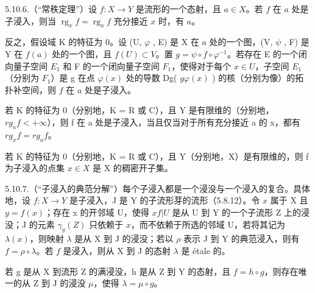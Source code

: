 5.10.6.（“常秩定理”）设 \(f: X \to Y\) 是流形的一个态射，且 \(a \in X\)。若 \(f\) 在 \(a\) 处是子浸入，则当 \(\operatorname{rg}_{x} f = \operatorname{rg}_{a} f\) 充分接近 \(x\) 时，有 \(a\)。

反之，假设域 K 的特征为 0。设 (U, \(\varphi\) , E) 是 X 在 \(a\) 处的一个图，(V, \(\psi\) , F) 是 Y 在 \(f(a)\) 处的一个图，且 \(f(U) \subset V\)。置 \(g = \psi \circ f \circ \varphi^{-1}\)。若存在 E 的一个闭向量子空间 \(E_{1}\) 和 F 的一个闭向量子空间 \(F_{1}\)，使得对于每个 \(x \in U\)，子空间 \(E_{1}\)（分别为 \(F_{1}\)）是 g 在点 \(\varphi(x)\) 处的导数 Dg( \(g\)\(\varphi(x)\) ) 的核（分别为像）的拓扑补空间，则 \(f\) 在 \(a\) 处是子浸入。

若 K 的特征为 0（分别地，K = R 或 C），且 Y 是有限维的（分别地，\(rg_{a}f < +\infty\)），则 f 在 a 处是子浸入，当且仅当对于所有充分接近 a 的 x，都有 \(rg_{x}f = rg_{a}f\)。

若 K 的特征为 0（分别地，K = R 或 C），且 Y（分别地，X）是有限维的，则 f 为子浸入的点集 \(x \in X\) 是 X 的稠密开子集。

5.10.7.（“子浸入的典范分解”）每个子浸入都是一个浸没与一个浸入的复合。具体地，设 \(f: X \to Y\) 是子浸入，J 是 Y 的子流形芽的流形（5.8.12）。令 \(x\) 属于 X 且 \(y = f(x)\)；存在 x 的开邻域 U，使得 \(x\)\(f|U\) 是从 U 到 Y 的一个子流形 Z 上的浸没；J 的元素 \(\gamma_y(Z)\) 只依赖于 \(x\)，而不依赖于所选的邻域 U，若将其记为 \(\lambda(x)\)，则映射 \(\lambda\) 是从 X 到 J 的浸没；若以 \(\rho\) 表示 J 到 Y 的典范浸入，则有 \(f = \rho \circ \lambda\)。若 \(f\) 是浸入，则从 X 到 J 的态射 \(\lambda\) 是 étale 的。

若 g 是从 X 到流形 Z 的满浸没，h 是从 Z 到 Y 的态射，且 \(f = h \circ g\)，则存在唯一的从 Z 到 J 的浸没 \(\mu\)，使得 \(\lambda = \mu \circ g\)。

